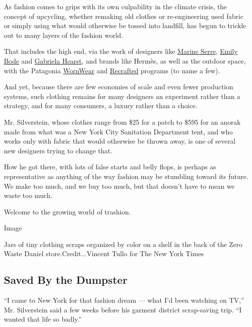 As fashion comes to grips with its own culpability in the climate
crisis, the concept of upcycling, whether remaking old clothes or
re-engineering used fabric or simply using what would otherwise be
tossed into landfill, has begun to trickle out to many layers of the
fashion world.

That includes the high end, via the work of designers like
\href{https://www.thecut.com/2019/11/marine-serre-upcycling-videos.html}{Marine
Serre},
\href{https://www.nytimes.com/2019/11/18/style/bode-emily-bode-shopping-brick-and-mortar-is-dead-lets-open-a-store.html}{Emily
Bode} and
\href{https://www.nytimes.com/2019/09/11/style/proenza-schouler-gabriela-hearst-new-york-fashion-week.html}{Gabriela
Hearst}, and brands like Hermès, as well as the outdoor space, with the
Patagonia
\href{https://mountainculturegroup.com/patagonia-worn-wear-program-review/}{WornWear}
and \href{https://wornwear.patagonia.com/shop/recrafted}{Recrafted}
programs (to name a few).

And yet, because there are few economies of scale and even fewer
production systems, such clothing remains for many designers an
experiment rather than a strategy, and for many consumers, a luxury
rather than a choice.

Mr. Silverstein, whose clothes range from \$25 for a patch to \$595 for
an anorak made from what was a New York City Sanitation Department tent,
and who works only with fabric that would otherwise be thrown away, is
one of several new designers trying to change that.

How he got there, with lots of false starts and belly flops, is perhaps
as representative as anything of the way fashion may be stumbling toward
its future. We make too much, and we buy too much, but that doesn't have
to mean we waste too much.

Welcome to the growing world of trashion.

Image

Jars of tiny clothing scraps organized by color on a shelf in the back
of the Zero Waste Daniel store.Credit...Vincent Tullo for The New York
Times

\hypertarget{saved-by-the-dumpster}{%
\subsection{Saved By the Dumpster}\label{saved-by-the-dumpster}}

``I came to New York for that fashion dream --- what I'd been watching
on TV,'' Mr. Silverstein said a few weeks before his garment district
scrap-saving trip. ``I wanted that life so badly.''

